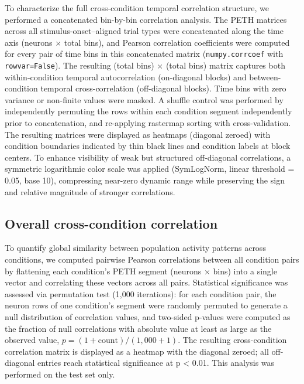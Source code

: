 \documentclass[10pt,lineno]{elife}
\begin{document}
To characterize the full cross-condition temporal correlation structure, we performed a concatenated bin-by-bin correlation analysis. The PETH matrices across all stimulus-onset–aligned trial types were concatenated along the time axis (neurons $\times$ total bins), and Pearson correlation coefficients were computed for every pair of time bins in this concatenated matrix (\texttt{numpy.corrcoef} with \texttt{rowvar=False}). The resulting (total bins) $\times$ (total bins) matrix captures both within-condition temporal autocorrelation (on-diagonal blocks) and between-condition temporal cross-correlation (off-diagonal blocks). Time bins with zero variance or non-finite values were masked. A shuffle control was performed by independently permuting the rows within each condition segment independently prior to concatenation, and re-applying rastermap sorting with cross-validation. The resulting matrices were displayed as heatmaps (diagonal zeroed) with condition boundaries indicated by thin black lines and condition labels at block centers. To enhance visibility of weak but structured off-diagonal correlations, a symmetric logarithmic color scale was applied (SymLogNorm, linear threshold = 0.05, base 10), compressing near-zero dynamic range while preserving the sign and relative magnitude of stronger correlations.

\subsection{Overall cross-condition correlation}
To quantify global similarity between population activity patterns across conditions, we computed pairwise Pearson correlations between all condition pairs by flattening each condition's PETH segment (neurons $\times$ bins) into a single vector and correlating these vectors across all pairs. Statistical significance was assessed via permutation test (1,000 iterations): for each condition pair, the neuron rows of one condition's segment were randomly permuted to generate a null distribution of correlation values, and two-sided p-values were computed as the fraction of null correlations with absolute value at least as large as the observed value, $p=(1 + \mathrm{count}) / (1,000 + 1)$. The resulting cross-condition correlation matrix is displayed as a heatmap with the diagonal zeroed; all off-diagonal entries reach statistical significance at p < 0.01. This analysis was performed on the test set only.
\end{document}
